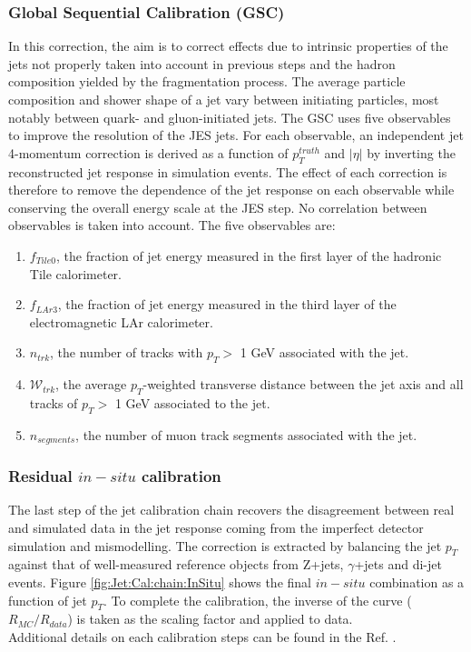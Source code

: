 \subsubsection{Global Sequential Calibration (GSC)}
\label{Jet:Cal:chain:GSC}
In this correction, the aim is to correct effects due to intrinsic properties of the jets not properly taken into account in previous steps and the hadron composition yielded by the fragmentation process. The average particle composition and shower shape of a jet vary between initiating particles, most notably between quark- and gluon-initiated jets. The GSC uses five observables to improve the resolution of the JES jets. For each observable, an independent jet 4-momentum correction is derived as a function of $p_{T}^{truth}$ and $|\eta|$ by inverting the reconstructed jet response in simulation events. The effect of each correction is therefore to remove the dependence of the jet response on each observable while conserving the overall energy scale at the JES step. No correlation between observables is taken into account. The five observables are:
\begin{enumerate}
    \item $f_{Tile0}$, the fraction of jet energy measured in the first layer of the hadronic Tile calorimeter.
    \item $f_{LAr3}$, the fraction of jet energy measured in the third layer of the electromagnetic LAr calorimeter.
    \item $n_{trk}$, the number of tracks with $p_T>$ 1 GeV associated with the jet.
    \item $\mathcal{W}_{trk}$, the average $p_T$-weighted transverse distance between the jet axis and all tracks of $p_T>$ 1 GeV associated to the jet.
    \item $n_{segments}$, the number of muon track segments associated with the jet.
\end{enumerate}

\subsubsection{Residual $in-situ$ calibration}
\label{Jet:Cal:chain:InSitu}
The last step of the jet calibration chain recovers the disagreement between real and simulated data in the jet response coming from the imperfect detector simulation and mismodelling. The correction is extracted by balancing the jet $p_T$ against that of well-measured reference objects from Z+jets, $\gamma$+jets and di-jet events. Figure \ref{fig:Jet:Cal:chain:InSitu} shows the final $in-situ$ combination as a function of jet $p_T$. To complete the calibration, the inverse of the curve ($R_{MC}/R_{data}$) is taken as the scaling factor and applied to data. \\
Additional details on each calibration steps can be found in the Ref. \cite{JES_Sys_13_TeV}. \\

